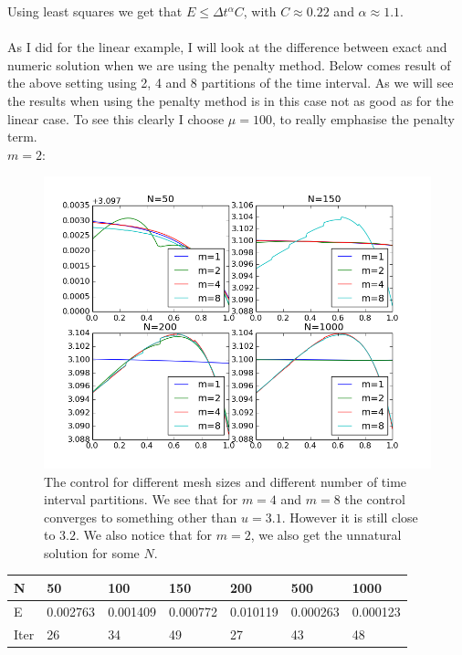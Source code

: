 \documentclass[11pt,a4paper]{report}
\begin{document}
Using least squares we get that $E\leq \Delta t^{\alpha}C$, with $C\approx 0.22$ and $\alpha\approx1.1$. 
\\
\\
As I did for the linear example, I will look at the difference between exact and numeric solution when we are using the penalty method. Below comes result of the above setting using 2, 4 and 8 partitions of the time interval. As we will see the results when using the penalty method is in this case not as good as for the linear case. To see this clearly I choose $\mu =100$, to really emphasise the penalty term.
\\
$m=2$:
\begin{figure}
  \includegraphics[width=\linewidth]{quad_manu_control.png}
  \caption{The control for different mesh sizes and different number of time interval partitions. We see that for $m=4$ and $m=8$ the control converges to something other than $u=3.1$. However it is still close to $3.2$. We also notice that for $m=2$, we also   get the unnatural solution for some $N$. }
  \label{Fig 4}
\end{figure}
\begin{center}
    \begin{tabular}{| l | l | l | l | l | l | l |}
    \hline
    N & 50 & 100  & 150 & 200 & 500 & 1000 \\ \hline
    E & 0.002763 & 0.001409 &0.000772 & 0.010119 & 0.000263 & 0.000123	\\ \hline
    Iter & 26 & 34  & 49 & 27 & 43 & 48 \\ \hline
    \end{tabular}
\end{center}
\end{document}
